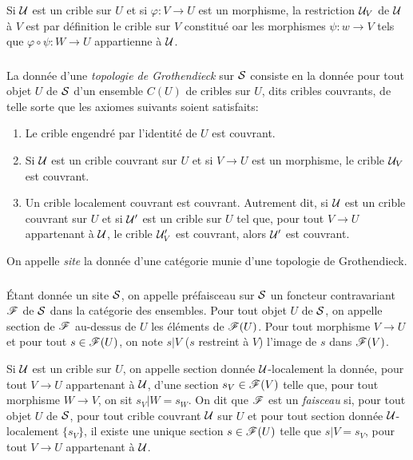 \documentclass[oneside]{book}
\begin{document}
Si $\mathcal{U}$ est un crible sur $U$ et si $\varphi:V\to U$ est un morphisme, la 
restriction $\mathcal{U}_V$ de $\mathcal{U}$ à $V$ est par définition le crible sur $V$ 
constitué oar les morphismes $\psi:w\to V$ tels que 
$\varphi\circ\psi:W\to U$ appartienne à $\mathcal{U}$.





\subsubsection{}\label{I:1-6-2}

La donnée d'une \emph{topologie de Grothendieck} sur $\mathcal{S}$ consiste en la 
donnée pour tout objet $U$ de $\mathcal{S}$ d'un ensemble $C(U)$ de cribles sur $U$, 
dits cribles couvrants, de telle sorte que les axiomes suivants soient 
satisfaits:
\begin{enumerate}[\indent a)]
  \item Le crible engendré par l'identité de $U$ est couvrant.
  \item Si $\mathcal{U}$ est un crible couvrant sur $U$ et si $V\to U$ est un 
    morphisme, le crible $\mathcal{U}_V$ est couvrant.
  \item Un crible localement couvrant est couvrant. Autrement dit, si $\mathcal{U}$ est 
    un crible couvrant sur $U$ et si $\mathcal{U}'$ est un crible sur $U$ tel que, pour 
    tout $V\to U$ appartenant à $\mathcal{U}$, le crible $\mathcal{U}_V'$ est couvrant, alors 
    $\mathcal{U}'$ est couvrant.
\end{enumerate}

On appelle \emph{site} la donnée d'une catégorie munie d'une topologie de 
Grothendieck.





\subsubsection{}\label{I:1-6-3}

Étant donnée un site $\mathcal{S}$, on appelle préfaisceau sur $\mathcal{S}$ un foncteur 
contravariant $\mathscr{F}$ de $\mathcal{S}$ dans la catégorie des ensembles. Pour tout 
objet $U$ de $\mathcal{S}$, on appelle section de $\mathscr{F}$ au-dessus de $U$ les 
éléments de $\mathscr{F}(U)$. Pour tout morphisme $V\to U$ et pour tout 
$s\in \mathscr{F}(U)$, on note $s|V$ ($s$ restreint à $V$) l'image de $s$ dans 
$\mathscr{F}(V)$.

Si $\mathcal{U}$ est un crible sur $U$, on appelle section donnée $\mathcal{U}$-localement la 
donnée, pour tout $V\to U$ appartenant à $\mathcal{U}$, d'une section 
$s_V\in\mathscr{F}(V)$ telle que, pour tout morphisme $W\to V$, on sit $s_V|W=s_W$. On 
dit que $\mathscr{F}$ est un \emph{faisceau} si, pour tout objet $U$ de $\mathcal{S}$, pour 
tout crible couvrant $\mathcal{U}$ sur $U$ et pour tout section donnée 
$\mathcal{U}$-localement $\{s_V\}$, il existe une unique section $s\in\mathscr{F}(U)$ telle que 
$s|V=s_V$, pour tout $V\to U$ appartenant à $\mathcal{U}$. 
\end{document}
